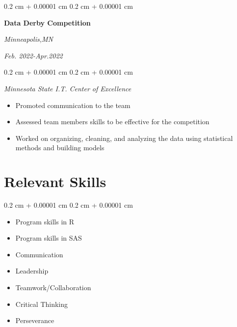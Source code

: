 \documentclass[10pt, letterpaper]{article}
\newenvironment{highlights}{
    \begin{itemize}[
        topsep=0.10 cm,
        parsep=0.10 cm,
        partopsep=0pt,
        itemsep=0pt,
        leftmargin=0.4 cm + 10pt
    ]
}{
    \end{itemize}
} %
\newenvironment{onecolentry}{
    \begin{adjustwidth}{
        0.2 cm + 0.00001 cm
    }{
        0.2 cm + 0.00001 cm
    }
}{
    \end{adjustwidth}
} %
\newenvironment{twocolentry}[2][]{
    \onecolentry
    \def\secondColumn{#2}
    \setcolumnwidth{\fill, 4.5 cm}
    \begin{paracol}{2}
}{
    \switchcolumn \raggedleft \secondColumn
    \end{paracol}
    \endonecolentry
} %
\begin{document}
\vspace{0.2cm}


         \begin{twocolentry}{
         
            \textit{Minneapolis,MN}
            
            \textit{Feb. 2022-Apr.2022}}
            
            \textbf{Data Derby Competition }
            
        \end{twocolentry}

        \vspace{0.10 cm}

        \begin{onecolentry}
        \textit{Minnesota State I.T. Center of Excellence}
            \begin{highlights}
                \item Promoted communication to the team
                \item Assessed team members skills to be effective for the competition
                \item Worked on organizing, cleaning, and analyzing the data using statistical methods and building models 
            \end{highlights}
        \end{onecolentry}


\section{Relevant Skills}

\begin{onecolentry}
\begin{highlights}
    
\item Program skills in R
\item Program skills in SAS
\item Communication
\item Leadership
\item Teamwork/Collaboration
\item Critical Thinking
\item Perseverance

\end{highlights}

\end{onecolentry}
\end{document}
